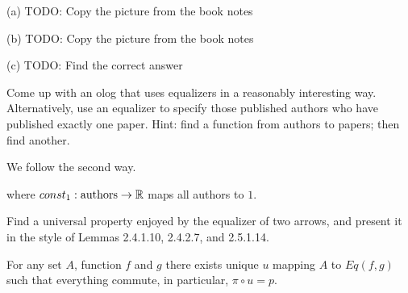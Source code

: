 \documentclass{article}
\begin{document}

(a)
TODO: Copy the picture from the book notes

(b)
TODO: Copy the picture from the book notes

(c)
TODO: Find the correct answer



Come up with an olog that uses equalizers in a reasonably interesting way.
Alternatively, use an equalizer to specify those published authors who have
published exactly one paper. Hint: find a function from authors to papers; then
find another.

\ans

We follow the second way.

\begin{center}
\end{center}

where $const_1 : \text{authors} \to \mathbb{R}$ maps all authors to $1$.


Find a universal property enjoyed by the equalizer of two arrows, and present
it in the style of Lemmas 2.4.1.10, 2.4.2.7, and 2.5.1.14.

\ans

For any set $A$, function $f$ and $g$ there exists unique $u$ mapping $A$ to
$Eq(f,g)$ such that everything commute, in particular, $\pi \circ u = p$.

\begin{center}
\end{center}

\end{document}
